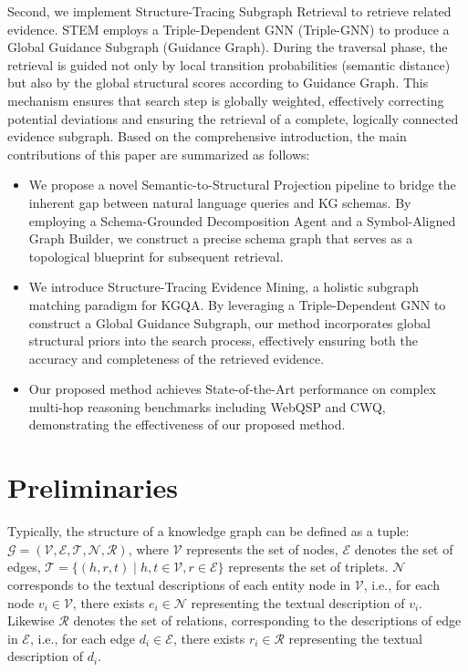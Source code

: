 \documentclass[11pt]{article}
\begin{document}
Second, we implement Structure-Tracing Subgraph Retrieval to retrieve related evidence. STEM employs a Triple-Dependent GNN (Triple-GNN) to produce a Global Guidance Subgraph (Guidance Graph). During the traversal phase, the retrieval is guided not only by local transition probabilities (semantic distance) but also by the global structural scores according to Guidance Graph. This mechanism ensures that search step is globally weighted, effectively correcting potential deviations and ensuring the retrieval of a complete, logically connected evidence subgraph. Based on the comprehensive introduction, the main contributions of this paper are summarized as follows:
\begin{itemize}
    \item We propose a novel Semantic-to-Structural Projection pipeline to bridge the inherent gap between natural language queries and KG schemas. By employing a Schema-Grounded Decomposition Agent and a Symbol-Aligned Graph Builder, we construct a precise schema graph that serves as a topological blueprint for subsequent retrieval.
    \item We introduce Structure-Tracing Evidence Mining, a holistic subgraph matching paradigm for KGQA. By leveraging a Triple-Dependent GNN to construct a Global Guidance Subgraph, our method incorporates global structural priors into the search process, effectively ensuring both the accuracy and completeness of the retrieved evidence.
    \item Our proposed method achieves State-of-the-Art performance on complex multi-hop reasoning benchmarks including WebQSP and CWQ, demonstrating the effectiveness of our proposed method.
\end{itemize}

\section{Preliminaries}
\label{subsec:preliminaries}
Typically, the structure of a knowledge graph can be defined as a tuple: \( \mathcal{G} = (\mathcal{V}, \mathcal{E}, \mathcal{T}, \mathcal{N}, \mathcal{R}) \), where \( \mathcal{V} \) represents the set of nodes, \( \mathcal{E} \) denotes the set of edges, \( \mathcal{T} = \{ (h, r, t) \mid h, t \in \mathcal{V}, r \in \mathcal{E} \} \) represents the set of triplets. \( \mathcal{N} \) corresponds to the textual descriptions of each entity node in \( \mathcal{V} \), i.e., for each node \( v_i \in \mathcal{V} \), there exists \( e_i \in \mathcal{N} \) representing the textual description of \( v_i \). Likewise \( \mathcal{R} \) denotes the set of relations, corresponding to the descriptions of edge in \( \mathcal{E} \), i.e., for each edge \( d_i \in \mathcal{E} \), there exists \( r_i \in \mathcal{R} \) representing the textual description of \( d_i \).
\end{document}
